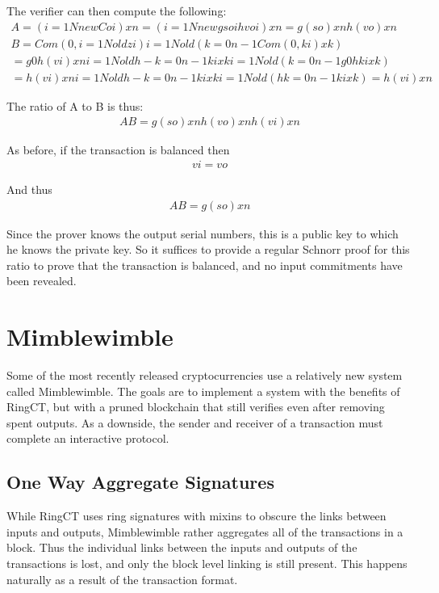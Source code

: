 \documentclass{article}
\begin{document}
The verifier can then compute the following:
\begin{eqnarray}
  A=(i=1NnewCoi)xn=(i=1Nnewgsoihvoi)xn=g( so) xnh( vo) xn\\
  B=Com(0,i=1Noldzi) i=1Nold(k=0n-1Com(0,ki)xk)\\
  =g0h( vi) xn i=1Noldh-k=0n-1kixki=1Nold(k=0n-1g0hkixk)\\
  =h( vi) xn i=1Noldh-k=0n-1kixki=1Nold(hk=0n-1kixk)=h( vi) xn
\end{eqnarray}

The ratio of A to B is thus:
\begin{eqnarray}
  AB=g( so) xnh( vo) xnh( vi) xn
\end{eqnarray}
  
As before, if the transaction is balanced then 
\begin{eqnarray}
  vi= vo
\end{eqnarray}

And thus
\begin{eqnarray}
  AB=g( so) xn
\end{eqnarray}

Since the prover knows the output serial numbers, this is a public key to which he knows the private key.  So it suffices to provide a regular Schnorr proof for this ratio to prove that the transaction is balanced, and no input commitments have been revealed.



\section{Mimblewimble}

Some of the most recently released cryptocurrencies use a relatively new system called Mimblewimble.  The goals are to implement a system with the benefits of RingCT, but with a pruned blockchain that still verifies even after removing spent outputs.  As a downside, the sender and receiver of a transaction must complete an interactive protocol.


\subsection{One Way Aggregate Signatures}

While RingCT uses ring signatures with mixins to obscure the links between inputs and outputs, Mimblewimble rather aggregates all of the transactions in a block.  Thus the individual links between the inputs and outputs of the transactions is lost, and only the block level linking is still present.  This happens naturally as a result of the transaction format.
\end{document}
